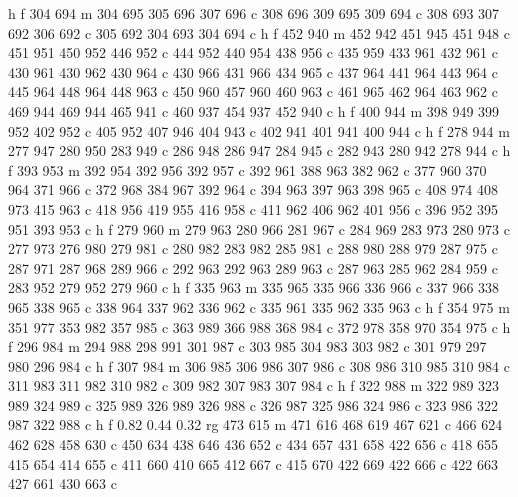 {{        h f
        304 694 m
        304 695 305 696 307 696 c
        308 696 309 695 309 694 c
        308 693 307 692 306 692 c
        305 692 304 693 304 694 c
        h f
        452 940 m
        452 942 451 945 451 948 c
        451 951 450 952 446 952 c
        444 952 440 954 438 956 c
        435 959 433 961 432 961 c
        430 961 430 962 430 964 c
        430 966 431 966 434 965 c
        437 964 441 964 443 964 c
        445 964 448 964 448 963 c
        450 960 457 960 460 963 c
        461 965 462 964 463 962 c
        469 944 469 944 465 941 c
        460 937 454 937 452 940 c
        h f
        400 944 m
        398 949 399 952 402 952 c
        405 952 407 946 404 943 c
        402 941 401 941 400 944 c
        h f
        278 944 m
        277 947 280 950 283 949 c
        286 948 286 947 284 945 c
        282 943 280 942 278 944 c
        h f
        393 953 m
        392 954 392 956 392 957 c
        392 961 388 963 382 962 c
        377 960 370 964 371 966 c
        372 968 384 967 392 964 c
        394 963 397 963 398 965 c
        408 974 408 973 415 963 c
        418 956 419 955 416 958 c
        411 962 406 962 401 956 c
        396 952 395 951 393 953 c
        h f
        279 960 m
        279 963 280 966 281 967 c
        284 969 283 973 280 973 c
        277 973 276 980 279 981 c
        280 982 283 982 285 981 c
        288 980 288 979 287 975 c
        287 971 287 968 289 966 c
        292 963 292 963 289 963 c
        287 963 285 962 284 959 c
        283 952 279 952 279 960 c
        h f
        335 963 m
        335 965 335 966 336 966 c
        337 966 338 965 338 965 c
        338 964 337 962 336 962 c
        335 961 335 962 335 963 c
        h f
        354 975 m
        351 977 353 982 357 985 c
        363 989 366 988 368 984 c
        372 978 358 970 354 975 c
        h f
        296 984 m
        294 988 298 991 301 987 c
        303 985 304 983 303 982 c
        301 979 297 980 296 984 c
        h f
        307 984 m
        306 985 306 986 307 986 c
        308 986 310 985 310 984 c
        311 983 311 982 310 982 c
        309 982 307 983 307 984 c
        h f
        322 988 m
        322 989 323 989 324 989 c
        325 989 326 989 326 988 c
        326 987 325 986 324 986 c
        323 986 322 987 322 988 c
        h f
        0.82 0.44 0.32 rg
        473 615 m
        471 616 468 619 467 621 c
        466 624 462 628 458 630 c
        450 634 438 646 436 652 c
        434 657 431 658 422 656 c
        418 655 415 654 414 655 c
        411 660 410 665 412 667 c
        415 670 422 669 422 666 c
        422 663 427 661 430 663 c
}}
